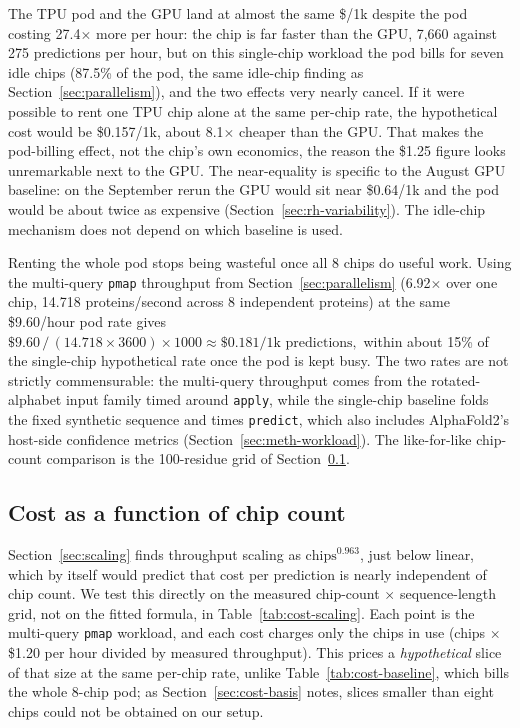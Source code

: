 The TPU pod and the GPU land at almost the same \$/1k despite the pod
costing 27.4$\times$ more per hour: the chip is far faster than the
GPU, 7{,}660 against 275 predictions per hour, but on this single-chip
workload the pod bills for seven idle chips (87.5\% of the pod, the
same idle-chip finding as Section~\ref{sec:parallelism}), and the two
effects very nearly cancel. If it were possible to rent
one TPU chip alone at the same per-chip rate, the hypothetical cost
would be \$0.157/1k, about 8.1$\times$ cheaper than the GPU. That
makes the pod-billing effect, not the chip's own economics, the reason
the \$1.25 figure looks unremarkable next to the GPU. The near-equality is specific to the August GPU baseline: on the
September rerun the GPU would sit near \$0.64/1k and the pod would be
about twice as expensive (Section~\ref{sec:rh-variability}). The
idle-chip mechanism does not depend on which baseline is used.


Renting the whole pod stops being wasteful once all 8 chips do useful
work. Using the multi-query \texttt{pmap} throughput from
Section~\ref{sec:parallelism} (6.92$\times$ over one chip, 14.718
proteins/second across 8 independent proteins) at the same \$9.60/hour pod
rate gives
$
\$9.60 \,/\, (14.718 \times 3600) \times 1000 \approx \$0.181\text{/1k predictions},
$
within about 15\% of the single-chip hypothetical rate once the pod is
kept busy. The two rates are not strictly commensurable: the
multi-query throughput comes from the rotated-alphabet input family
timed around \texttt{apply}, while the single-chip baseline folds the
fixed synthetic sequence and times \texttt{predict}, which also
includes AlphaFold2's host-side confidence metrics
(Section~\ref{sec:meth-workload}). The like-for-like chip-count
comparison is the 100-residue grid of Section~\ref{sec:cost-scaling}.

\subsection{Cost as a function of chip count}
\label{sec:cost-scaling}

Section~\ref{sec:scaling} finds throughput scaling as
$\mathrm{chips}^{0.963}$, just below linear, which by itself would
predict that cost per prediction is nearly independent of chip count.
We test this directly on the measured chip-count $\times$ sequence-length
grid, not on the fitted formula, in Table~\ref{tab:cost-scaling}. Each
point is the multi-query \texttt{pmap} workload, and each cost charges
only the chips in use (chips $\times$ \$1.20 per hour divided by
measured throughput). This prices a \emph{hypothetical} slice of that
size at the same per-chip rate, unlike Table~\ref{tab:cost-baseline},
which bills the whole 8-chip pod; as Section~\ref{sec:cost-basis}
notes, slices smaller than eight chips could not be obtained on our
setup.

